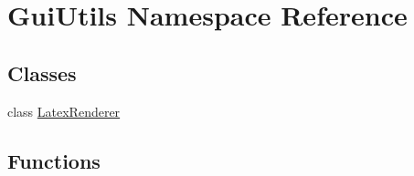 \hypertarget{namespaceGuiUtils}{\section{Gui\+Utils Namespace Reference}
\label{namespaceGuiUtils}
}
\subsection*{Classes}
\begin{DoxyCompactItemize}
\item 
class \hyperlink{classGuiUtils_1_1LatexRenderer}{Latex\+Renderer}
\end{DoxyCompactItemize}
\subsection*{Functions}
